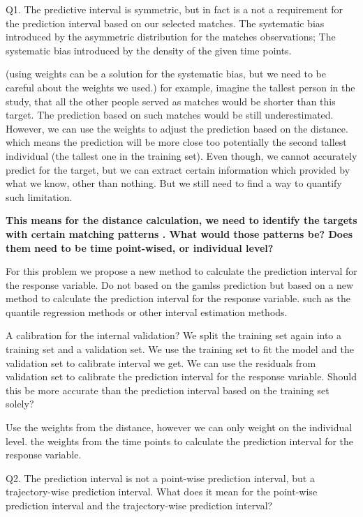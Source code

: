 \documentclass[useAMS,usenatbib,referee]{biom}
\begin{document}
Q1. The predictive interval is symmetric, but in fact is a not a
requirement for the prediction interval based on our selected matches.
The systematic bias introduced by the asymmetric distribution for the
matches observations; The systematic bias introduced by the density of
the given time points.

(using weights can be a solution for the systematic bias, but we need to
be careful about the weights we used.) for example, imagine the tallest
person in the study, that all the other people served as matches would
be shorter than this target. The prediction based on such matches would
be still underestimated. However, we can use the weights to adjust the
prediction based on the distance. which means the prediction will be
more close too potentially the second tallest individual (the tallest
one in the training set). Even though, we cannot accurately predict for
the target, but we can extract certain information which provided by
what we know, other than nothing. But we still need to find a way to
quantify such limitation.

\textbf{This means for the distance calculation, we need to identify the
targets with certain matching patterns . What would those patterns be?
Does them need to be time point-wised, or individual level?}

For this problem we propose a new method to calculate the prediction
interval for the response variable. Do not based on the gamlss
prediction but based on a new method to calculate the prediction
interval for the response variable. such as the quantile regression
methods or other interval estimation methods.

A calibration for the internal validation? We split the training set
again into a training set and a validation set. We use the training set
to fit the model and the validation set to calibrate interval we get. We
can use the residuals from validation set to calibrate the prediction
interval for the response variable. Should this be more accurate than
the prediction interval based on the training set solely?

Use the weights from the distance, however we can only weight on the
individual level. the weights from the time points to calculate the
prediction interval for the response variable.

Q2. The prediction interval is not a point-wise prediction interval, but
a trajectory-wise prediction interval. What does it mean for the
point-wise prediction interval and the trajectory-wise prediction
interval?
\end{document}
